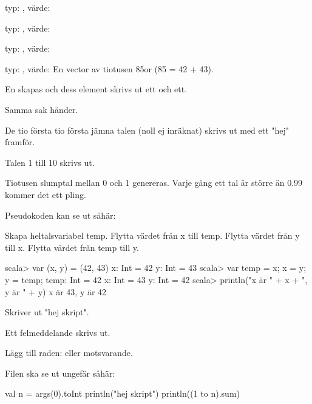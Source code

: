 \Subtask typ: , värde: 

\Subtask typ: , värde: 

\Subtask typ: , värde: 

\Subtask typ: , värde: En vector av tiotusen 85or (85 = 42 + 43).

\Task 

\Subtask En  skapas och dess element skrivs ut ett och ett.

\Subtask Samma sak händer.

\Subtask De tio första tio första jämna talen (noll ej inräknat) skrivs ut med ett "hej" framför.

\Subtask Talen 1 till 10 skrivs ut.

\Subtask Tiotusen slumptal mellan 0 och 1 genereras. Varje gång ett tal är större än 0.99 kommer det ett pling.

\Task 

\Subtask Pseudokoden kan se ut såhär:

Skapa heltalsvariabel temp. 
Flytta värdet från x till temp. 
Flytta värdet från y till x. 
Flytta värdet från temp till y.

\Subtask
\begin{REPLnonum}
scala> var (x, y) = (42, 43)
x: Int = 42
y: Int = 43
scala> var temp = x; x = y; y = temp;
temp: Int = 42
x: Int = 43
y: Int = 42
scala> println("x är " + x + ", y är " + y)
x är 43, y är 42
\end{REPLnonum}

\Task 

\Subtask Skriver ut "hej skript".

\Subtask Ett felmeddelande skrivs ut.

\Subtask Lägg till raden:
eller motsvarande.

\Subtask Filen ska se ut ungefär såhär: \\
\begin{Code} 
val n = args(0).toInt 
println("hej skript") 
println((1 to n).sum)
\end{Code}

\Subtask {}

